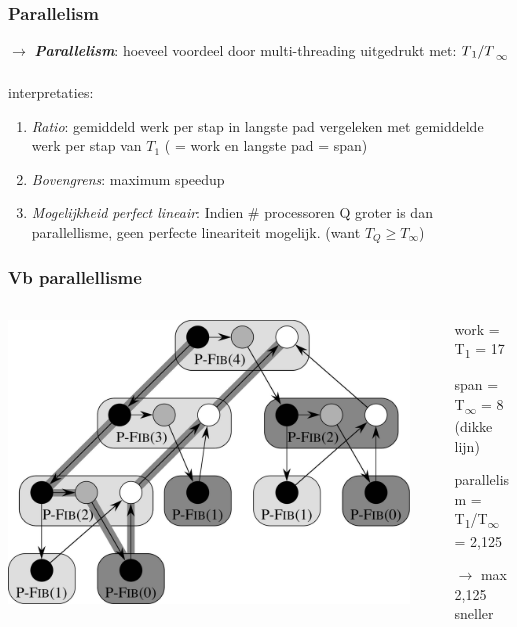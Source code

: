 \documentclass
   [kulak] %
   {kulakbeamer}
\begin{document}
\begin{frame}
	\frametitle{Parallelism}
	$\rightarrow$ \textbf{\textit{Parallelism}}: hoeveel voordeel door multi-threading uitgedrukt met: $T\textsubscript{1}/T$\textsubscript{$\infty$} \\~\\
	 interpretaties:
	\begin{enumerate}
		\item \textit{Ratio}: gemiddeld werk per stap in langste pad vergeleken met gemiddelde werk per stap van $T_1$ ( = work en langste pad = span)
		
		\pause
		\item \textit{Bovengrens}: maximum speedup
		
		\pause
		\item \textit{Mogelijkheid perfect lineair}: Indien \# processoren Q groter is dan parallellisme, geen perfecte lineariteit mogelijk. (want $T_Q \geqslant T_\infty$)
	\end{enumerate}
\end{frame}

\begin{frame}
\frametitle{Vb parallellisme}

\begin{columns}[T]
	\begin{column}{.6\textwidth}
		\includegraphics[width=\textwidth]{fig2.jpg}			
	\end{column}
	\begin{column}{.35\textwidth}
		\begin{minipage}[c][.6\textheight][c]{\linewidth}
			\begin{itemize}
				\item[] work = T\textsubscript{1} = 17
				\item[] span = T\textsubscript{$\infty$} = 8 (dikke lijn)
				\item[] parallelism = T\textsubscript{1}/T\textsubscript{$\infty$} = 2,125
				\item[$\rightarrow$] max 2,125 sneller
				
			\end{itemize}
			
			
		\end{minipage}
	\end{column}
\end{columns}
\end{frame}
\end{document}
